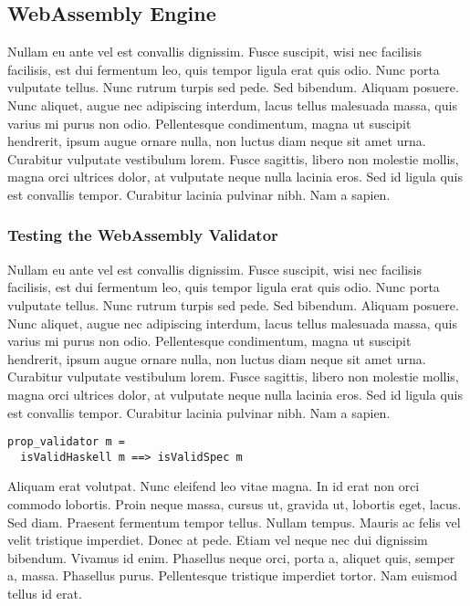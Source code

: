 \documentclass[acmsmall, anonymous]{acmart}
\begin{document}
\subsection{WebAssembly Engine}

Nullam eu ante vel est convallis dignissim. Fusce suscipit, wisi nec facilisis
facilisis, est dui fermentum leo, quis tempor ligula erat quis odio. Nunc porta
vulputate tellus. Nunc rutrum turpis sed pede. Sed bibendum. Aliquam posuere.
Nunc aliquet, augue nec adipiscing interdum, lacus tellus malesuada massa, quis
varius mi purus non odio. Pellentesque condimentum, magna ut suscipit hendrerit,
ipsum augue ornare nulla, non luctus diam neque sit amet urna. Curabitur
vulputate vestibulum lorem. Fusce sagittis, libero non molestie mollis, magna
orci ultrices dolor, at vulputate neque nulla lacinia eros. Sed id ligula quis
est convallis tempor. Curabitur lacinia pulvinar nibh. Nam a sapien.

\subsubsection{Testing the WebAssembly Validator}

Nullam eu ante vel est convallis dignissim. Fusce suscipit, wisi nec facilisis
facilisis, est dui fermentum leo, quis tempor ligula erat quis odio. Nunc porta
vulputate tellus. Nunc rutrum turpis sed pede. Sed bibendum. Aliquam posuere.
Nunc aliquet, augue nec adipiscing interdum, lacus tellus malesuada massa, quis
varius mi purus non odio. Pellentesque condimentum, magna ut suscipit hendrerit,
ipsum augue ornare nulla, non luctus diam neque sit amet urna. Curabitur
vulputate vestibulum lorem. Fusce sagittis, libero non molestie mollis, magna
orci ultrices dolor, at vulputate neque nulla lacinia eros. Sed id ligula quis
est convallis tempor. Curabitur lacinia pulvinar nibh. Nam a sapien.


\begin{verbatim}
prop_validator m =
  isValidHaskell m ==> isValidSpec m
\end{verbatim}

Aliquam erat volutpat. Nunc eleifend leo vitae magna. In id erat non orci
commodo lobortis. Proin neque massa, cursus ut, gravida ut, lobortis eget,
lacus. Sed diam. Praesent fermentum tempor tellus. Nullam tempus. Mauris ac
felis vel velit tristique imperdiet. Donec at pede. Etiam vel neque nec dui
dignissim bibendum. Vivamus id enim. Phasellus neque orci, porta a, aliquet
quis, semper a, massa. Phasellus purus. Pellentesque tristique imperdiet tortor.
Nam euismod tellus id erat.
\end{document}
